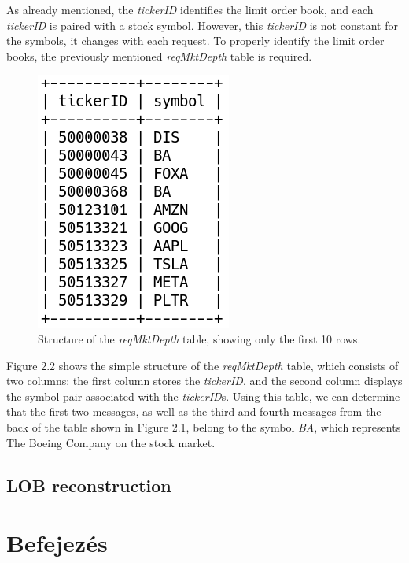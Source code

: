 \documentclass[a4paper,oneside,onecolumn,12pt]{LegrandOrangeBook}
\begin{document}
As already mentioned, the \textit{tickerID} identifies the limit order book, and each \textit{tickerID} is paired with a stock symbol. However, this \textit{tickerID} is not constant for the symbols, it changes with each request. To properly identify the limit order books, the previously mentioned \textit{reqMktDepth} table is required.\\
\begin{figure}[H]
\begin{center}
	\includegraphics[scale=0.75]{kep/reqMktDepth.png}
	\caption{Structure of the \textit{reqMktDepth} table, showing only the first 10 rows.}
\end{center}
\end{figure}

Figure 2.2 shows the simple structure of the \textit{reqMktDepth} table, which consists of two columns: the first column stores the \textit{tickerID}, and the second column displays the symbol pair associated with the \textit{tickerID}s. Using this table, we can determine that the first two messages, as well as the third and fourth messages from the back of the table shown in Figure 2.1, belong to the symbol \textit{BA}, which represents The Boeing Company on the stock market.\\

\section{LOB reconstruction}

\chapter*{Befejezés}
\end{document}
